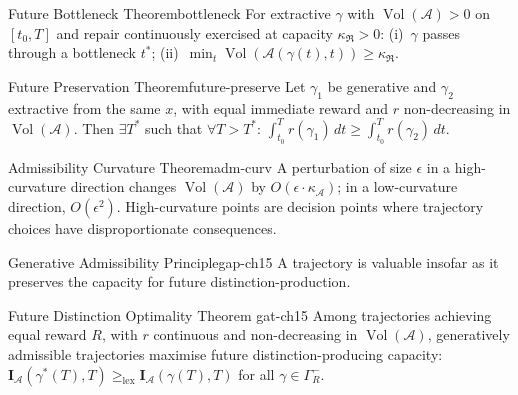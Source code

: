 \documentclass[12pt,twoside,openright]{book}
\newcommand{\adm}{\mathcal{A}}
\newcommand{\repair}{\mathfrak{R}}
\newcommand{\Vol}{\operatorname{Vol}}
\newcounter{exercise}[chapter]
\begin{document}
\begin{theorem}{Future Bottleneck Theorem}{bottleneck}
  For extractive $\gamma$ with $\Vol(\adm)>0$ on $[t_0,T]$
  and repair continuously exercised at capacity
  $\kappa_\repair>0$:
  (i)~$\gamma$ passes through a bottleneck $t^*$;
  (ii)~$\min_t\Vol(\adm(\gamma(t),t))\ge\kappa_\repair$.
\end{theorem}

\begin{theorem}{Future Preservation Theorem}{future-preserve}
  Let $\gamma_1$ be generative and $\gamma_2$ extractive
  from the same $x$, with equal immediate reward and $r$
  non-decreasing in $\Vol(\adm)$.
  Then $\exists T^*$ such that $\forall T>T^*$:
  $\int_{t_0}^T r(\gamma_1)\,dt\ge
  \int_{t_0}^T r(\gamma_2)\,dt$.
\end{theorem}

\begin{theorem}{Admissibility Curvature Theorem}{adm-curv}
  A perturbation of size $\epsilon$ in a high-curvature
  direction changes $\Vol(\adm)$ by
  $O(\epsilon\cdot\kappa_\adm)$; in a low-curvature
  direction, $O(\epsilon^2)$.
  High-curvature points are decision points where
  trajectory choices have disproportionate consequences.
\end{theorem}

\begin{principle}{Generative Admissibility Principle}{gap-ch15}
  A trajectory is valuable insofar as it preserves the
  capacity for future distinction-production.
\end{principle}

\begin{theorem}{Future Distinction Optimality Theorem}%
  {gat-ch15}
  Among trajectories achieving equal reward $R$, with
  $r$ continuous and non-decreasing in $\Vol(\adm)$,
  generatively admissible trajectories maximise
  future distinction-producing capacity:
  $\mathbf{I}_\adm(\gamma^*(T),T)
  \ge_\mathrm{lex}\mathbf{I}_\adm(\gamma(T),T)$
  for all $\gamma\in\Gamma_R^-$.
\end{theorem}
\end{document}

